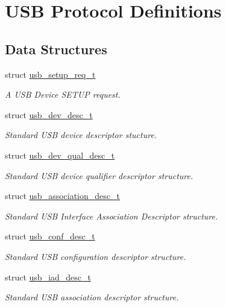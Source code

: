 \hypertarget{group__usb__protocol__group}{
\section{\-U\-S\-B \-Protocol \-Definitions}
\label{group__usb__protocol__group}
}
\subsection*{\-Data \-Structures}
\begin{DoxyCompactItemize}
\item 
struct \hyperlink{structusb__setup__req__t}{usb\-\_\-setup\-\_\-req\-\_\-t}
\begin{DoxyCompactList}\small\item\em \-A \-U\-S\-B \-Device \-S\-E\-T\-U\-P request. \end{DoxyCompactList}\item 
struct \hyperlink{structusb__dev__desc__t}{usb\-\_\-dev\-\_\-desc\-\_\-t}
\begin{DoxyCompactList}\small\item\em \-Standard \-U\-S\-B device descriptor stucture. \end{DoxyCompactList}\item 
struct \hyperlink{structusb__dev__qual__desc__t}{usb\-\_\-dev\-\_\-qual\-\_\-desc\-\_\-t}
\begin{DoxyCompactList}\small\item\em \-Standard \-U\-S\-B device qualifier descriptor structure. \end{DoxyCompactList}\item 
struct \hyperlink{structusb__association__desc__t}{usb\-\_\-association\-\_\-desc\-\_\-t}
\begin{DoxyCompactList}\small\item\em \-Standard \-U\-S\-B \-Interface \-Association \-Descriptor structure. \end{DoxyCompactList}\item 
struct \hyperlink{structusb__conf__desc__t}{usb\-\_\-conf\-\_\-desc\-\_\-t}
\begin{DoxyCompactList}\small\item\em \-Standard \-U\-S\-B configuration descriptor structure. \end{DoxyCompactList}\item 
struct \hyperlink{structusb__iad__desc__t}{usb\-\_\-iad\-\_\-desc\-\_\-t}
\begin{DoxyCompactList}\small\item\em \-Standard \-U\-S\-B association descriptor structure. \end{DoxyCompactList}\item 

\end{DoxyCompactItemize}
